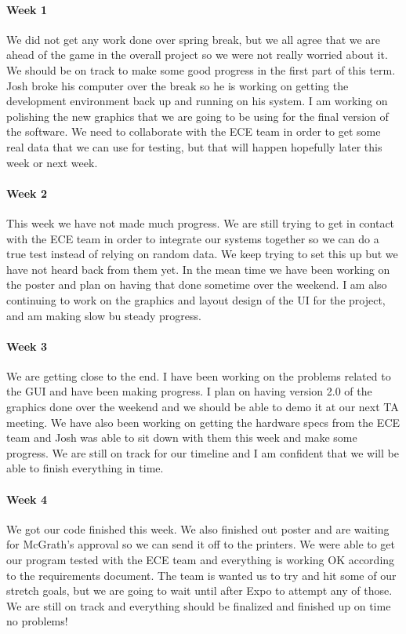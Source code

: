 \documentclass[10pt,draftclsnofoot,onecolumn,retainorgcmds]{IEEEtran}
\begin{document}
\paragraph{Week 1}
We did not get any work done over spring break, but we all agree that we are ahead of the game in the overall project so we were not really worried about it. We should be on track to make some good progress in the first part of this term. Josh broke his computer over the break so he is working on getting the development environment back up and running on his system. I am working on polishing the new graphics that we are going to be using for the final version of the software. We need to collaborate with the ECE team in order to get some real data that we can use for testing, but that will happen hopefully later this week or next week. \\
\paragraph{Week 2}
This week we have not made much progress. We are still trying to get in contact with the ECE team in order to integrate our systems together so we can do a true test instead of relying on random data. We keep trying to set this up but we have not heard back from them yet. In the mean time we have been working on the poster and plan on having that done sometime over the weekend. I am also continuing to work on the graphics and layout design of the UI for the project, and am making slow bu steady progress.\\
\paragraph{Week 3}
We are getting close to the end. I have been working on the problems related to the GUI and have been making progress. I plan on having version 2.0 of the graphics done over the weekend and we should be able to demo it at our next TA meeting. We have also been working on getting the hardware specs from the ECE team and Josh was able to sit down with them this week and make some progress. We are still on track for our timeline and I am confident that we will be able to finish everything in time.\\
\paragraph{Week 4}
We got our code finished this week. We also finished out poster and are waiting for McGrath's approval so we can send it off to the printers. We were able to get our program tested with the ECE team and everything is working OK according to the requirements document. The team is wanted us to try and hit some of our stretch goals, but we are going to wait until after Expo to attempt any of those. We are still on track and everything should be finalized and finished up on time no problems!\\
\end{document}
